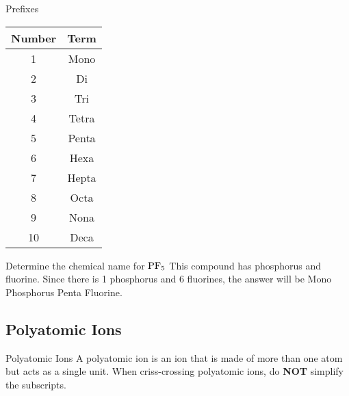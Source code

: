 \documentclass[12pt]{report}
\begin{document}
\begin{table}[h!] %

    \renewcommand{\arraystretch}{1.5} %
    \setlength{\tabcolsep}{10pt} %
    \setlength{\arrayrulewidth}{0.25mm}

    \begin{center}
        Prefixes \\
        \vspace{0.5em}
        \begin{tabular}{|c|c|} %
        \hline
        \textbf{Number} & \textbf{Term} \\ %
        \hline
        1 & Mono \\ %
        \hline
        2 & Di\\ 
        \hline 
        3 & Tri\\ 
        \hline 
        4 & Tetra\\ 
        \hline
        5 & Penta\\
        \hline 
        6 & Hexa\\ 
        \hline 
        7 & Hepta\\ 
        \hline 
        8 & Octa\\ 
        \hline 
        9 & Nona\\ 
        \hline 
        10 & Deca\\
        \hline
        \end{tabular}
    \end{center}
\end{table}

\begin{example}{Determine the chemical name for $\ce{PF5}$}
   This compound has phosphorus and fluorine. Since there is 1 phosphorus and 6 fluorines, the answer will be Mono Phosphorus Penta Fluorine. 
\end{example}

\subsection{Polyatomic Ions}
\begin{definition}{Polyatomic Ions}
A polyatomic ion is an ion that is made of more than one atom but acts as a single unit. When criss-crossing polyatomic ions, do \textbf{NOT} simplify the subscripts. 
\end{definition}
\end{document}
